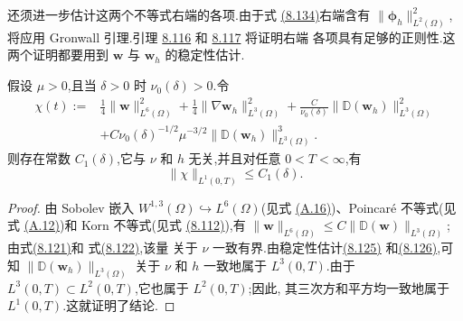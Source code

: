\begin{note}[关于不等式(8.130)和(8.134)]
\label{note:smagorinsky-error-estimates-regularity}
还须进一步估计这两个不等式右端的各项.由于式
\hyperref[eq:smagorinsky-error-convection-estimate]{(8.134)}右端含有
$\|\symbf{\phi}_h\|_{L^2(\Omega)}^2$,将应用 Gronwall 引理.引理
\hyperref[lem:smagorinsky-error-bracket-integrability]{8.116} 和
\hyperref[lem:smagorinsky-error-other-terms-integrability]{8.117} 将证明右端
各项具有足够的正则性.这两个证明都要用到 $\bm{w}$ 与
$\bm{w}_h$ 的稳定性估计.
\end{note}

\begin{lemma}[式(8.134)方括号内各项的时间正则性]
\label{lem:smagorinsky-error-bracket-integrability}
假设 $\mu>0$,且当 $\delta>0$ 时 $\nu_0(\delta)>0$.令
\[
\begin{aligned}
\chi(t):={}&\frac14\|\bm{w}\|_{L^6(\Omega)}^2
 +\frac14\|\nabla\bm{w}_h\|_{L^3(\Omega)}^2
 +\frac{C}{\nu_0(\delta)}
       \|\mathbb{D}(\bm{w}_h)\|_{L^3(\Omega)}^2\\
&+C\nu_0(\delta)^{-1/2}\mu^{-3/2}
       \|\mathbb{D}(\bm{w}_h)\|_{L^3(\Omega)}^3.
\end{aligned}
\]
则存在常数 $C_1(\delta)$,它与 $\nu$ 和 $h$ 无关,并且对任意
$0<T<\infty$,有
\[
\|\chi\|_{L^1(0,T)}\le C_1(\delta).
\]
\begin{proof}
由 Sobolev 嵌入 $W^{1,3}(\Omega)\hookrightarrow L^6(\Omega)$(见式
\hyperref[eq:appendix-a-16]{(A.16)})、Poincaré 不等式(见式
\hyperref[eq:appendix-a-12]{(A.12)})和 Korn 不等式(见式
\hyperref[eq:smagorinsky-generalized-korn-inequality]{(8.112)}),有
$\|\bm{w}\|_{L^6(\Omega)}\le C\|\mathbb{D}(\bm{w})\|_{L^3(\Omega)}$;
由式\hyperref[eq:smagorinsky-uniform-stability]{(8.121)}和
式\hyperref[eq:smagorinsky-weighted-stability]{(8.122)},该量
关于 $\nu$ 一致有界.由稳定性估计\hyperref[eq:smagorinsky-fem-uniform-stability]{(8.125)}
和\hyperref[eq:smagorinsky-fem-weighted-stability]{(8.126)},可知
$\|\mathbb{D}(\bm{w}_h)\|_{L^3(\Omega)}$ 关于 $\nu$ 和 $h$ 一致地属于
$L^3(0,T)$.由于 $L^3(0,T)\subset L^2(0,T)$,它也属于 $L^2(0,T)$;因此,
其三次方和平方均一致地属于 $L^1(0,T)$.这就证明了结论.
\end{proof}
\end{lemma}




